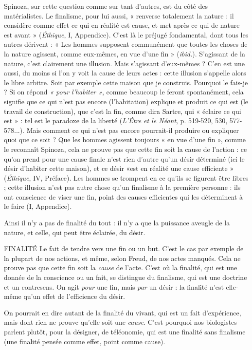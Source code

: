 Spinoza, sur cette question comme sur tant d’autres, est du côté des matérialistes.
Le finalisme, pour lui aussi, « renverse totalement la nature : il considère
comme effet ce qui en réalité est cause, et met après ce qui de nature est
avant » ({\it Éthique}, I, Appendice). C’est là le préjugé fondamental, dont tous les
autres dérivent : « Les hommes supposent communément que toutes les choses
de la nature agissent, comme eux-mêmes, en vue d’une fin » ({\it ibid.}). S'agissant
de la nature, c’est clairement une illusion. Mais s'agissant d’eux-mêmes ? C'en
est une aussi, du moins si l’on y voit la cause de leurs actes : cette illusion
s'appelle alors le libre arbitre. Soit par exemple cette maison que je construis.
Pourquoi le fais-je ? Si on répond {\it « pour l'habiter »}, comme beaucoup le feront
spontanément, cela signifie que ce qui n’est pas encore (l’habitation) explique
et produit ce qui est (le travail de construction), que c’est la fin, comme dira
Sartre, qui « éclaire ce qui est » : tel est le paradoxe de la liberté ({\it L'Étre et le
Néant}, p. 519-520, 530, 577-578...). Mais comment ce qui n’est pas encore
pourrait-il produire ou expliquer quoi que ce soit ? Que les hommes agissent
toujours « en vue d’une fin », comme le reconnaît Spinoza, cela ne prouve pas
que cette fin soit la cause de l’action : ce qu’on prend pour une cause finale
n’est rien d’autre qu’un désir déterminé (ici le désir d’habiter cette maison),
et ce désir «est en réalité une cause efficiente » ({\it Éthique}, IV, Préface). Les
hommes se trompent en ce qu’ils se figurent être libres ; cette illusion n’est
pas autre chose qu’un finalisme à la première personne : ils ont conscience de
viser une fin, point des causes efficientes qui les déterminent à le faire
(I, Appendice).

Ainsi il n’y a pas de finalité du tout : il n’y a que la puissance aveugle de la
nature, et celle, qui peut être éclairée, du désir.

FINALITÉ Le fait de tendre vers une fin ou un but. C’est le cas par exemple
de la plupart de nos actions, et même, selon Freud, de nos actes
manqués. Cela ne prouve pas que cette fin soit la {\it cause} de l’acte. C’est où la
finalité, qui est une donnée de la conscience ou un fait, se distingue du finalisme,
qui est une doctrine et un contresens. On agit {\it pour} une fin, mais {\it par} un
désir : la finalité n’est elle-même qu’un effet de l'efficience du désir.

On pourrait en dire autant de la finalité du vivant, qui est un fait d’expérience,
mais dont rien ne prouve qu’elle soit une {\it cause}. C’est pourquoi nos biologistes
parlent plutôt, pour la désigner, de téléonomie, qui est une finalité sans
finalisme (une finalité pensée comme effet, point comme cause).

